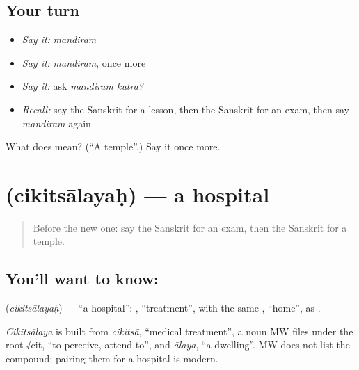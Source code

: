 \subsection*{Your turn}
\begin{itemize}
\raggedright
  \item \emph{Say it:} \emph{mandiram}
  \item \emph{Say it:} \emph{mandiram}, once more
  \item \emph{Say it:} ask \emph{mandiram kutra?}
  \item \emph{Recall:} say the Sanskrit for a lesson, then the Sanskrit for an exam, then say \emph{mandiram} again
\end{itemize}

\begin{tcolorbox}[breakable,colback=teal!4,colframe=teal!35!black,title={Before you move on}]
What does  mean? (\textquotedblleft{}A temple\textquotedblright{}.) Say it once more.
\end{tcolorbox}
\section[\texorpdfstring{\sk{चिकित्सालयः} (cikitsālayaḥ)}{चिकित्सालयः (cikitsālayaḥ)}]{ (cikitsālayaḥ) — a hospital}

\label{lesson:SA-C84-hospital}



\begin{quote}
Before the new one: say the Sanskrit for an exam, then the Sanskrit for a temple.
\end{quote}

\subsection*{You'll want to know: }
\textbf{} (\emph{cikitsālayaḥ}) — \textquotedblleft{}a hospital\textquotedblright{}: \textbf{}, \textquotedblleft{}treatment\textquotedblright{}, with the same \textbf{}, \textquotedblleft{}home\textquotedblright{}, as \textbf{}.

\begin{cousinweb}
\emph{Cikitsālaya} is built from \emph{cikitsā}, \textquotedblleft{}medical treatment\textquotedblright{}, a noun MW files under the root √cit, \textquotedblleft{}to perceive, attend to\textquotedblright{}, and \emph{ālaya}, \textquotedblleft{}a dwelling\textquotedblright{}. MW does not list the compound: pairing them for a hospital is modern.
\end{cousinweb}

